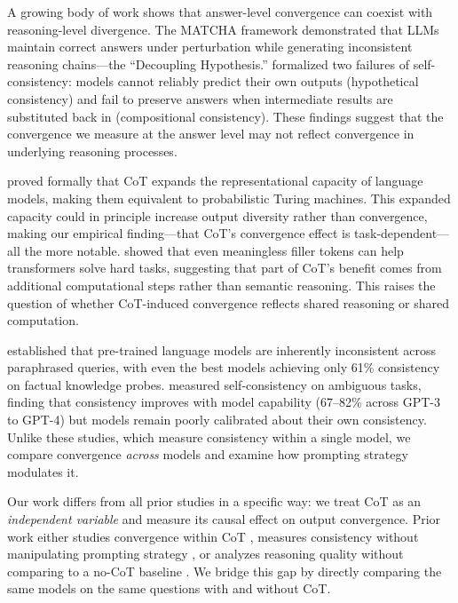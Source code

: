  A growing body of work shows that answer-level convergence can coexist with reasoning-level divergence. The MATCHA framework \citep{matcha2025} demonstrated that LLMs maintain correct answers under perturbation while generating inconsistent reasoning chains---the ``Decoupling Hypothesis.'' \citet{chen2023two} formalized two failures of self-consistency: models cannot reliably predict their own outputs (hypothetical consistency) and fail to preserve answers when intermediate results are substituted back in (compositional consistency). These findings suggest that the convergence we measure at the answer level may not reflect convergence in underlying reasoning processes.

 \citet{merrill2024representational} proved formally that CoT expands the representational capacity of language models, making them equivalent to probabilistic Turing machines. This expanded capacity could in principle increase output diversity rather than convergence, making our empirical finding---that CoT's convergence effect is task-dependent---all the more notable. \citet{pfau2024dots} showed that even meaningless filler tokens can help transformers solve hard tasks, suggesting that part of CoT's benefit comes from additional computational steps rather than semantic reasoning. This raises the question of whether CoT-induced convergence reflects shared reasoning or shared computation.

 \citet{elazar2021measuring} established that pre-trained language models are inherently inconsistent across paraphrased queries, with even the best models achieving only 61\% consistency on factual knowledge probes. \citet{pfau2023self} measured self-consistency on ambiguous tasks, finding that consistency improves with model capability (67--82\% across GPT-3 to GPT-4) but models remain poorly calibrated about their own consistency. Unlike these studies, which measure consistency within a single model, we compare convergence \emph{across} models and examine how prompting strategy modulates it.

 Our work differs from all prior studies in a specific way: we treat CoT as an \emph{independent variable} and measure its causal effect on output convergence. Prior work either studies convergence within CoT \citep{wang2022self, xiong2025mapping}, measures consistency without manipulating prompting strategy \citep{elazar2021measuring, pfau2023self}, or analyzes reasoning quality without comparing to a no-CoT baseline \citep{chen2023two, matcha2025}. We bridge this gap by directly comparing the same models on the same questions with and without CoT.
